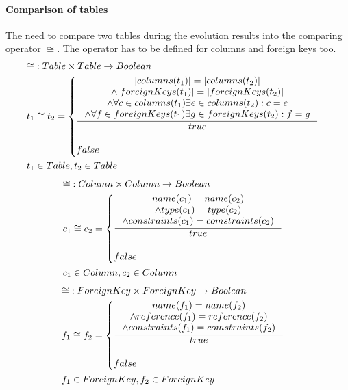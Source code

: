\documentclass[11pt]{article}
\begin{document}
\paragraph{Comparison of tables} The need to compare two tables during the evolution results into the comparing operator $\cong$. The operator has to be defined for columns and foreign keys too.
\begin{align*}
&	\mathbf{\cong} : Table \times Table \rightarrow Boolean \\
&	t_1 \cong t_2 = \begin{cases}
 		\inference{|columns(t_1)| = |columns(t_2)| \\ \wedge |foreignKeys(t_1)| = |foreignKeys(t_2)| \\ \wedge \forall c \in columns(t_1) \exists e \in columns(t_2) : c = e \\ \wedge \forall f \in foreignKeys(t_1) \exists g \in foreignKeys(t_2) : f = g }{true}\\\\
 false
 \end{cases}\\
& t_1 \in Table, t_2 \in Table
\end{align*}
\begin{align*}
&	\mathbf{\cong} : Column \times Column \rightarrow Boolean \\
&	c_1 \cong c_2 = \begin{cases}
 		\inference{name(c_1) = name(c_2) \\ \wedge type(c_1) = type(c_2) \\ \wedge constraints(c_1) = comstraints(c_2)}{true}
 		\\ \\
		false
 \end{cases}\\
& c_1 \in Column, c_2 \in Column
\end{align*}
\begin{align*}
&	\mathbf{\cong} : ForeignKey \times ForeignKey \rightarrow Boolean \\
&	f_1 \cong f_2 = \begin{cases}
 		\inference{name(f_1) = name(f_2) \\ \wedge reference(f_1) = reference(f_2) \\ \wedge constraints(f_1) = comstraints(f_2)}{true}
 		\\ \\
		false
 \end{cases}\\
& f_1 \in ForeignKey, f_2 \in ForeignKey
\end{align*}
\end{document}
